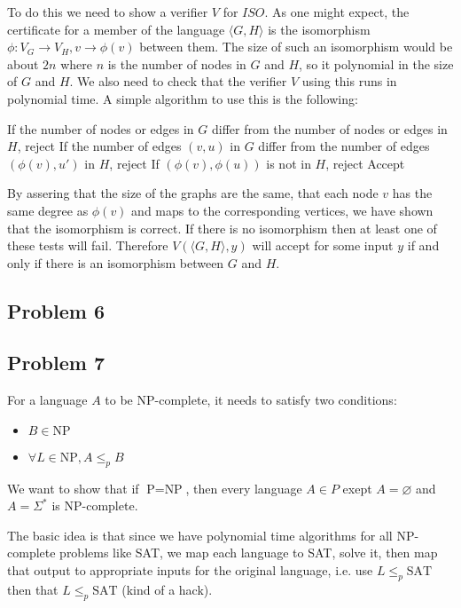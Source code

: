 \documentclass[english]{article}
\begin{document}
To do this we need to show a verifier $V$ for $ISO$. As one might expect, the
certificate for a member of the language $\langle G, H \rangle$ is the
isomorphism $\phi: V_G \rightarrow V_H, v \rightarrow \phi(v)$ between them.
The size of such an isomorphism would be about $2n$ where $n$ is the number of
nodes in $G$ and $H$, so it polynomial in the size of $G$ and $H$. 
We also need to check that the verifier $V$ using this runs in polynomial
time. A simple algorithm to use this is the following:

\begin{algorithmic}
\State If the number of nodes or edges in $G$ differ from the number of nodes
		or edges in $H$, reject
	\State If the number of edges $(v,u)$ in $G$ differ from the number of
			edges $(\phi(v),u')$ in $H$, reject
		\State If $(\phi(v),\phi(u))$ is not in $H$, reject
	\EndFor
\EndFor
\State Accept
\EndFunction 
\end{algorithmic}

By assering that the size of the graphs are the same, that each node $v$ has
the same degree as $\phi(v)$ and maps to the corresponding vertices, we have
shown that the isomorphism is correct. If there is no isomorphism then at
least one of these tests will fail. Therefore $V(\langle G, H \rangle,y)$
will accept for some input $y$ if and only if there is an isomorphism between
$G$ and $H$.

\subsection*{Problem 6}

\subsection*{Problem 7}
For a language $A$ to be NP-complete, it needs to satisfy two conditions:
\begin{itemize}
\item $B \in \textrm{NP}$
\item $\forall L \in \textrm{NP}, A \le_p B$
\end{itemize}
We want to show that if $\textrm{P} = \textrm{NP}$, then every language
$A \in P$ exept $A = \varnothing$ and $A = \Sigma^*$ is NP-complete. 

The basic idea is that since we have polynomial time algorithms for all
NP-complete problems like SAT, we map each language to SAT, solve it, then map
that output to appropriate inputs for the original language, i.e. use
$L \le_p \textrm{SAT}$ then that $L \le_p \textrm{SAT}$ (kind of a hack). 
\end{document}
